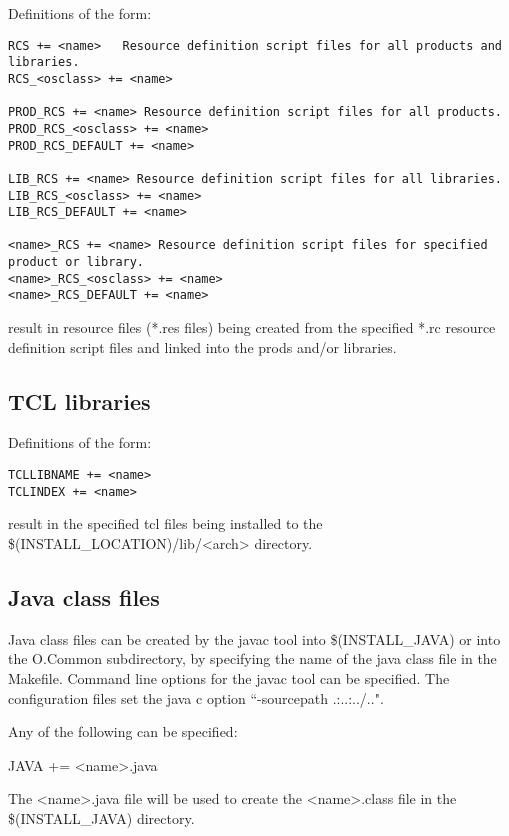 Definitions of the form:

\begin{verbatim}RCS += <name>   Resource definition script files for all products and libraries.
RCS_<osclass> += <name>

PROD_RCS += <name> Resource definition script files for all products.
PROD_RCS_<osclass> += <name>
PROD_RCS_DEFAULT += <name>

LIB_RCS += <name> Resource definition script files for all libraries.
LIB_RCS_<osclass> += <name>
LIB_RCS_DEFAULT += <name>

<name>_RCS += <name> Resource definition script files for specified product or library.
<name>_RCS_<osclass> += <name>
<name>_RCS_DEFAULT += <name>

\end{verbatim}
result in resource files (*.res files) being created from the specified *.rc resource definition script files and linked into the 
prods and/or libraries.

\subsection{TCL libraries}

Definitions of the form:

\begin{verbatim}TCLLIBNAME += <name>
TCLINDEX += <name>
\end{verbatim}
result in the specified tcl files being installed to the \$(INSTALL\_LOCATION)/lib/\textless{}arch\textgreater{} directory.

\subsection{Java class files}

Java class files can be created by the javac tool into \$(INSTALL\_JAVA) or into the O.Common subdirectory, by 
specifying the name of the java class file in the Makefile. Command line options for the javac tool can be specified. The 
configuration files set the java c option ``-sourcepath .:..:../..".

Any of the following can be specified:

\begin{description}\item {}JAVA += \textless{}name\textgreater{}.java

\end{description}The \textless{}name\textgreater{}.java file will be used to create the \textless{}name\textgreater{}.class file in the \$(INSTALL\_JAVA) directory.


